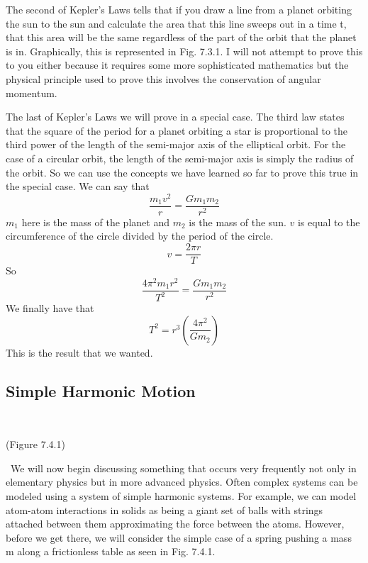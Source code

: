 \documentclass{article}[gray]
\numberwithin{equation}{subsection}
\begin{document}
The second of Kepler’s Laws tells that if you draw a line from a planet orbiting the sun to the sun and calculate the area that this line sweeps out in a time t, that this area will be the same regardless of the part of the orbit that the planet is in. Graphically, this is represented in Fig. 7.3.1. I will not attempt to prove this to you either because it requires some more sophisticated mathematics but the physical principle used to prove this involves the conservation of angular momentum. 

The last of Kepler’s Laws we will prove in a special case. The third law states that the square of the period for a planet orbiting a star is proportional to the third power of the length of the semi-major axis of the elliptical orbit. For the case of a circular orbit, the length of the semi-major axis is simply the radius of the orbit. So we can use the concepts we have learned so far to prove this true in the special case. We can say that $$\frac{m_1v^2}{r} =\frac{Gm_1m_2}{r^2}$$ $m_1$ here is the mass of the planet and $m_2$ is the mass of the sun. $v$ is equal to the circumference of the circle divided by the period of the circle. \begin{equation}v=\frac{2\pi r}{T}\end{equation} So \begin{equation}\frac{4 \pi^2 m_1 r^2}{T^2}=\frac{Gm_1m_2}{r^2}\end{equation} We finally have that \begin{equation}T^2=r^3 \left(\frac{4\pi^2}{Gm_2}\right)\end{equation} This is the result that we wanted.
\subsection{Simple Harmonic Motion}
\
\ 
\newline
{}
\begin{center}
(Figure 7.4.1)
\end{center}
\
We will now begin discussing something that occurs very frequently not only in elementary physics but in more advanced physics. Often complex systems can be modeled using a system of simple harmonic systems. For example, we can model atom-atom interactions in solids as being a giant set of balls with strings attached between them approximating the force between the atoms. However, before we get there, we will consider the simple case of a spring pushing a mass m along a frictionless table as seen in Fig. 7.4.1. 
\end{document}
